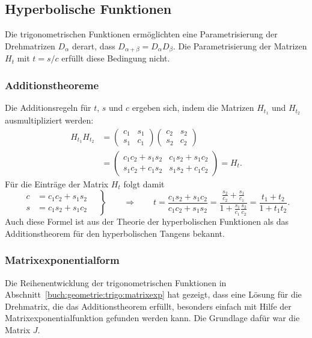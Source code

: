 %
% 
\subsection{Hyperbolische Funktionen}
Die trigonometrischen Funktionen ermöglichten eine Parametrisierung
der Drehmatrizen $D_\alpha$ derart, dass
$D_{\alpha+\beta}=D_\alpha D_\beta$.
Die Parametrisierung der Matrizen $H_t$ mit $t=s/c$ erfüllt diese
Bedingung nicht.

%
%
\subsubsection{Additionstheoreme}
Die Additionsregeln für $t$, $s$ und $c$ ergeben sich, indem die
Matrizen $H_{t_1}$ und $H_{t_2}$ ausmultipliziert werden:
\begin{align*}
H_{t_1}H_{t_2}
&=
\begin{pmatrix}
c_1&s_1\\
s_1&c_1
\end{pmatrix}
\begin{pmatrix}
c_2&s_2\\
s_2&c_2
\end{pmatrix}
\\
&=
\begin{pmatrix}
c_1c_2+s_1s_2 & c_1s_2 + s_1c_2 \\
s_1c_2+c_1s_2 & s_1s_2 + c_1c_2
\end{pmatrix}
=
H_t.
\end{align*}
Für die Einträge der Matrix $H_t$ folgt damit
\[
\left.
\begin{aligned}
c&=c_1c_2+s_1s_2
\\
s&=c_1s_2+s_1c_2
\end{aligned}
\quad\right\}
\qquad\Rightarrow\qquad
t
=
\frac{c_1s_2+s_1c_2}{c_1c_2+s_1s_2}
=
\frac{\frac{s_2}{c_2}+\frac{s_1}{c_1}}{1+\frac{s_1}{c_1}\frac{s_2}{c_2}}
=
\frac{t_1+t_2}{1+t_1t_2}.
\]
Auch diese Formel ist aus der Theorie der hyperbolischen Funktionen
als das Additionstheorem für den hyperbolischen Tangens bekannt.

%
%
\subsubsection{Matrixexponentialform}
Die Reihenentwicklung der trigonometrischen Funktionen in
Abschnitt~\ref{buch:geometrie:trigo:matrixexp} hat gezeigt,
dass eine Lösung für die Drehmatrix, die das Additionstheorem
erfüllt, besonders einfach mit Hilfe der Matrixexponentialfunktion
gefunden werden kann.
Die Grundlage dafür war die Matrix $J$.

